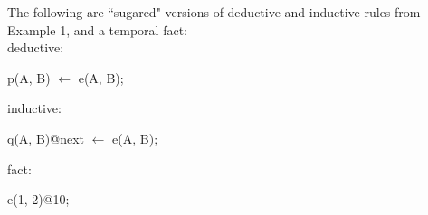 \begin{example}
The following are ``sugared" versions of deductive and inductive rules from Example 1, and a temporal fact:
\\
deductive:
\begin{Dedalus}
p(A, B) \(\leftarrow\) e(A, B);
\end{Dedalus}
inductive:
\begin{Dedalus}
q(A, B)@next \(\leftarrow\) e(A, B);
\end{Dedalus}
fact:
\begin{Dedalus}
e(1, 2)@10;
\end{Dedalus}

\end{example}









